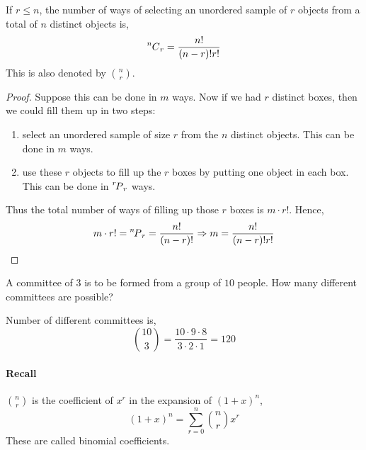 \begin{theorem}
    If $r \leq n$, the number of ways of selecting an unordered sample of $r$
objects from a total of $n$ distinct objects is,
\begin{equation*}
    \comb[n]{r} = \frac{n!}{(n - r)!r!}
\end{equation*}
This is also denoted by $n \choose r$.
\end{theorem}
\begin{proof}
    Suppose this can be done in $m$ ways. Now if we had $r$ distinct boxes,
then we could fill them up in two steps:
\begin{enumerate}[noitemsep,topsep=0pt]
\item 
    select an unordered sample of size $r$ from the $n$ distinct objects.
    This can be done in $m$ ways.
\item
    use these $r$ objects to fill up the $r$ boxes by putting one object in
    each box. This can be done in $\perm[r]{r}$ ways.
\end{enumerate}
Thus the total number of ways of filling up those $r$ boxes is $m \cdot
r!$. Hence,
\begin{equation*}
    m \cdot r! = \perm[n]{r} = \frac{n!}{(n - r)!}
    \Rightarrow
    m = \frac{n!}{(n - r)!r!}
\end{equation*}
\end{proof}

\begin{example}
    A committee of $3$ is to be formed from a group of $10$ people. How many
different committees are possible?
\end{example}
\begin{solution}
    Number of different committees is,
    \begin{equation*}
        {10 \choose 3} = \frac{10 \cdot 9 \cdot 8}{3 \cdot 2 \cdot 1} = 120
    \end{equation*}
\end{solution}

\paragraph{Recall} ${n \choose r}$ is the coefficient of $x^r$ in the expansion
of $(1+x)^n$,
\begin{equation*}
    (1+x)^n = \sum_{r = 0}^n {n \choose r} x^r
\end{equation*}
These are called binomial coefficients. 

